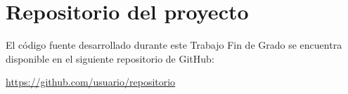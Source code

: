 \documentclass[12pt,a4paper,twoside]{book}
\begin{document}
\section{Repositorio del proyecto}

El código fuente desarrollado durante este Trabajo Fin de Grado se encuentra disponible en el siguiente repositorio de GitHub:

\url{https://github.com/usuario/repositorio}
\end{document}
